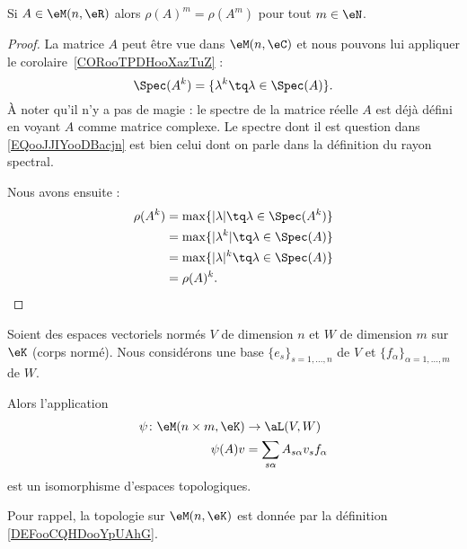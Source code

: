 \begin{proposition}     \label{PROPooYPLGooWKLbPA}
	Si \( A\in \eM(n,\eR)\) alors \( \rho(A)^m=\rho(A^m)\) pour tout \( m\in \eN\).
\end{proposition}

\begin{proof}
	La matrice \( A\) peut être vue dans \( \eM(n,\eC)\) et nous pouvons lui appliquer le corolaire~\ref{CORooTPDHooXazTuZ} :
	\begin{equation}        \label{EQooJJIYooDBacjn}
		\Spec(A^k)=\{ \lambda^k\tq \lambda\in\Spec(A) \}.
	\end{equation}
	À noter qu'il n'y a pas de magie : le spectre de la matrice réelle \( A\) est déjà défini en voyant \( A\) comme matrice complexe. Le spectre dont il est question dans \eqref{EQooJJIYooDBacjn} est bien celui dont on parle dans la définition du rayon spectral.

	Nous avons ensuite :
	\begin{subequations}
		\begin{align}
			\rho(A^k) & =\max\{ | \lambda |\tq \lambda\in\Spec(A^k) \} \\
			          & =\max\{ | \lambda^k |\tq \lambda\in\Spec(A) \} \\
			          & =\max\{ | \lambda |^k\tq\lambda\in\Spec(A) \}  \\
			          & =\rho(A)^k.
		\end{align}
	\end{subequations}
\end{proof}

\begin{proposition}     \label{PROPooXEQLooHvzVVm}
	Soient des espaces vectoriels normés \( V\) de dimension \( n\) et \( W\) de dimension \( m\) sur \( \eK\) (corps normé). Nous considérons une base \( \{ e_s \}_{s=1,\ldots, n}\) de \( V\) et \( \{ f_{\alpha} \}_{\alpha=1,\ldots, m}\) de \( W\).

	Alors l'application
	\begin{equation}
		\begin{aligned}
			\psi\colon \eM(n\times m,\eK) & \to \aL(V,W)                            \\
			\psi(A)v                      & =\sum_{s\alpha}A_{s\alpha}v_sf_{\alpha}
		\end{aligned}
	\end{equation}
	est un isomorphisme d'espaces topologiques.

	Pour rappel, la topologie sur \( \eM(n,\eK)\) est donnée par la définition \ref{DEFooCQHDooYpUAhG}.
\end{proposition}

